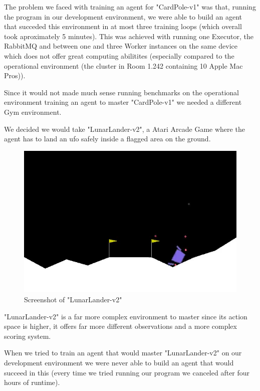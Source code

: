 The problem we faced with training an agent for
"CardPole-v1" was that, running the program in our
development environment, we were able to build an agent
that succeded this environment in at most three training
loops (which overall took aproximately 5 minutes). This was
achieved with running one Executor, the RabbitMQ and
between one and three Worker instances on the same device
which does not offer great computing abilitites (especially
compared to the operational environment (the cluster in
Room 1.242 containing 10 Apple Mac Pros)).

Since it would not made much sense running benchmarks on
the operational environment training an agent to master
"CardPole-v1" we needed a different Gym environment.

We decided we would take "LunarLander-v2", a Atari Arcade
Game where the agent has to land an ufo safely inside a
flagged area on the ground.

\begin{figure}[H]
  \centering
  \includegraphics[width=\textwidth/2]
  {diagrams/lunarlander.jpg}
  \caption{Screenshot of "LunarLander-v2"}
\end{figure}

"LunarLander-v2" is a far more complex environment to
master since its action space is higher, it offers far more
different observations and a more complex scoring system.

When we tried to train an agent that would master
"LunarLander-v2" on our development environment we were
never able to build an agent that would succeed in this
(every time we tried running our program we canceled after
four hours of runtime).

